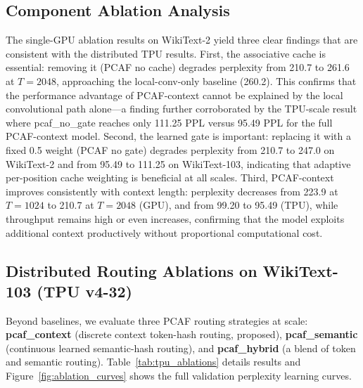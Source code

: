 \documentclass{article}
\begin{document}
\subsection{Component Ablation Analysis}

The single-GPU ablation results on WikiText-2 yield three clear findings
that are consistent with the distributed TPU results. First, the associative
cache is essential: removing it (PCAF no cache) degrades perplexity from 210.7
to 261.6 at $T{=}2048$, approaching the local-conv-only baseline (260.2). This
confirms that the performance advantage of PCAF-context cannot be explained
by the local convolutional path alone---a finding further corroborated by the
TPU-scale result where pcaf\_no\_gate reaches only 111.25 PPL versus 95.49 PPL
for the full PCAF-context model. Second, the learned gate is important:
replacing it with a fixed 0.5 weight (PCAF no gate) degrades perplexity from
210.7 to 247.0 on WikiText-2 and from 95.49 to 111.25 on WikiText-103,
indicating that adaptive per-position cache weighting is beneficial at all
scales. Third, PCAF-context improves consistently with context length:
perplexity decreases from 223.9 at $T{=}1024$ to 210.7 at $T{=}2048$ (GPU),
and from 99.20 to 95.49 (TPU), while throughput remains high or even increases,
confirming that the model exploits additional context productively without
proportional computational cost.

\subsection{Distributed Routing Ablations on WikiText-103 (TPU v4-32)}

Beyond baselines, we evaluate three PCAF routing strategies at scale:
\textbf{pcaf\_context} (discrete context token-hash routing, proposed),
\textbf{pcaf\_semantic} (continuous learned semantic-hash routing), and
\textbf{pcaf\_hybrid} (a blend of token and semantic routing).
Table~\ref{tab:tpu_ablations} details results and Figure~\ref{fig:ablation_curves}
shows the full validation perplexity learning curves.
\end{document}
